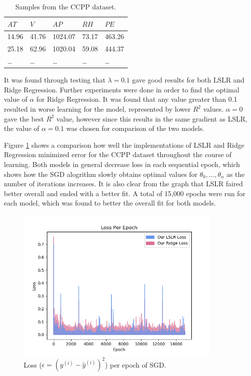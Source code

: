 \documentclass[letterpaper]{article} %
\begin{document}
\begin{table}[t]
\begin{centering}
\bgroup
\def\arraystretch{1.5}
\begin{tabular}{| m{} | m{} | m{} | m{} | m{}|} 
\hline
$AT$ & $V$ & $AP$ & $RH$ & $PE$ \\ 
\hline
\hline
14.96 & 41.76 & 1024.07 & 73.17 & 463.26 \\ 
\hline
25.18 & 62.96 & 1020.04 & 59.08 & 444.37 \\ 
\hline
\ldots & \ldots & \ldots & \ldots & \ldots \\ 
\hline
\end{tabular}
\caption{Samples from the CCPP dataset.}
\label{tbl:ccpp}
\egroup
\end{centering}
\end{table}

It was found through testing that $\lambda = 0.1$ gave good results
for both LSLR and Ridge Regression.
Further experiments were done in order to find the optimal value of $\alpha$
for Ridge Regression. It was found that any value greater than 0.1 resulted
in worse learning for the model, represented by lower $R^2$ values.
$\alpha = 0$ gave the best $R^2$ value, 
however since this results in the same gradient as LSLR,
the value of $\alpha = 0.1$ was chosen for comparison of the two models.

Figure \ref{fig:loss_per_epoch} shows a comparison how well the implementations of LSLR and Ridge Regression
minimized error for the CCPP dataset throughout the course of learning.
Both models in general decrease loss in each sequential epoch,
which shows how the SGD alogrithm slowly obtains optimal values
for $\theta_{0},\dots,\theta_{n}$ as the number of iterations increases.
It is also clear from the graph that LSLR faired better overall
and ended with a better fit.
A total of 15,000 epochs were run for each model, which was found to better the overall fit for both models.

\begin{figure}[htbp]
\centerline{\includegraphics[width=10cm]{loss_per_epoch.png}}
\caption{Loss ($\epsilon = (y^{(i)} - \hat{y}^{(i)})^2$) per epoch of SGD.}
\label{fig:loss_per_epoch}
\end{figure}
\end{document}
